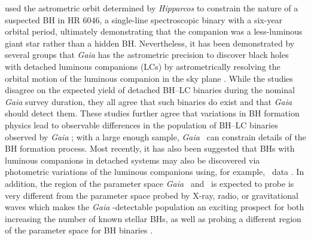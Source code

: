 \documentclass[twocolumn,tighten]{aastex61}
\newcommand{\gaia}{{\it Gaia} }
\newcommand{\TESS}{\italic{TESS}}
\begin{document}
\citet{torres2007} used the astrometric orbit determined by {\it Hipparcos} to constrain the nature of a suspected BH in HR 6046, a single-line spectroscopic binary with a six-year orbital period, ultimately demonstrating that the companion was a less-luminous giant star rather than a hidden BH. Nevertheless, it has been demonstrated by several groups that \gaia has the astrometric precision to discover black holes with detached luminous companions (LCs) by astrometrically resolving the orbital motion of the luminous companion in the sky plane \citep{Breivik2017_gaia,Mashian2017_gaia,Yamaguchi2018_gaia,Yalinewich2018_gaia}. While the studies disagree on the expected yield of detached BH--LC binaries during the nominal \gaia survey duration, they all agree that such binaries do exist and that \gaia should detect them. These studies further agree that variations in BH formation physics lead to observable differences in the population of BH--LC binaries observed by \gaia; with a large enough sample, \gaia\ can constrain details of the BH formation process. Most recently, it has also been suggested that BHs with luminous companions in detached systems may also be discovered via photometric variations of the luminous companions using, for example, \TESS\ data \citep{Masuda2018_TESS}.
In addition, the region of the parameter space \gaia\ and \TESS\ is expected to probe is very different from the parameter space probed by X-ray, radio, or gravitational waves which makes the \gaia-detectable population an exciting prospect for both increasing the number of known stellar BHs, as well as probing a different region of the parameter space for BH binaries \citep[e.g.,][]{Breivik2017_gaia}. 
\end{document}
